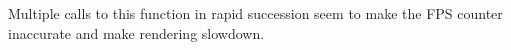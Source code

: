 
\begin{DoxyRefList}
\item[\label{bug__bug000001}%
\hypertarget{bug__bug000001}{}%
Member \hyperlink{class_canvas_a82f53634a21ab8bf7daf6586ad4c313f}{Canvas\+:\+:take\+Screen\+Shot} ()]Multiple calls to this function in rapid succession seem to make the F\+P\+S counter inaccurate and make rendering slowdown. 
\end{DoxyRefList}